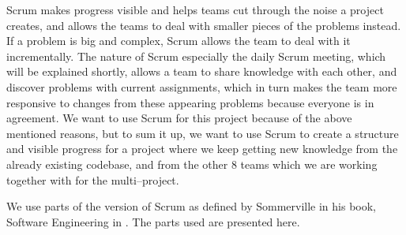 Scrum makes progress visible and helps teams cut through the noise a project creates, and allows the teams to deal with smaller pieces of the problems instead.
If a problem is big and complex, Scrum allows the team to deal with it incrementally.
The nature of Scrum especially the daily Scrum meeting, which will be explained shortly, allows a team to share knowledge with each other, and discover problems with current assignments, which in turn makes the team more responsive to changes from these appearing problems because everyone is in agreement.
We want to use Scrum for this project because of the above mentioned reasons, but to sum it up, we want to use Scrum to create a structure and visible progress for a project where we keep getting new knowledge from the already existing codebase, and from the other 8 teams which we are working together with for the multi--project.

\bigskip
We use parts of the version of Scrum as defined by Sommerville in his book, Software Engineering in \cite[Chapter~3]{SEBOOK}.
The parts used are presented here.

